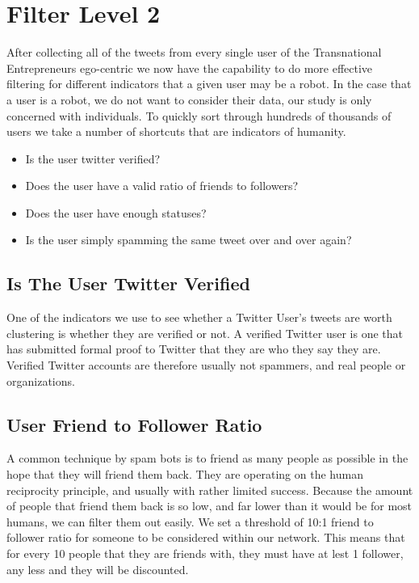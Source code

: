 \section{Filter Level 2}
After collecting all of the tweets from every single user of the
Transnational Entrepreneurs ego-centric we now have the capability to
do more effective filtering for different indicators that a given user
may be a robot. In the case that a user is a robot, we do not want to
consider their data, our study is only concerned with individuals. To
quickly sort through hundreds of thousands of users we take a number
of shortcuts that are indicators of humanity.

\begin{itemize}
\item Is the user twitter verified?
\item Does the user have a valid ratio of friends to followers?
\item Does the user have enough statuses?
\item Is the user simply spamming the same tweet over and over again?
\end{itemize}

\subsection{Is The User Twitter Verified}
One of the indicators we use to see whether a Twitter User's tweets
are worth clustering is whether they are verified or not. A verified
Twitter user is one that has submitted formal proof to Twitter that
they are who they say they are. Verified Twitter accounts are
therefore usually not spammers, and real people or organizations.

\subsection{User Friend to Follower Ratio}
A common technique by spam bots is to friend as many people as
possible in the hope that they will friend them back. They are
operating on the human reciprocity principle, and usually with rather
limited success. Because the amount of people that friend them back is
so low, and far lower than it would be for most humans, we can filter
them out easily. We set a threshold of 10:1 friend to follower ratio
for someone to be considered within our network. This means that for
every 10 people that they are friends with, they must have at lest 1
follower, any less and they will be discounted.

